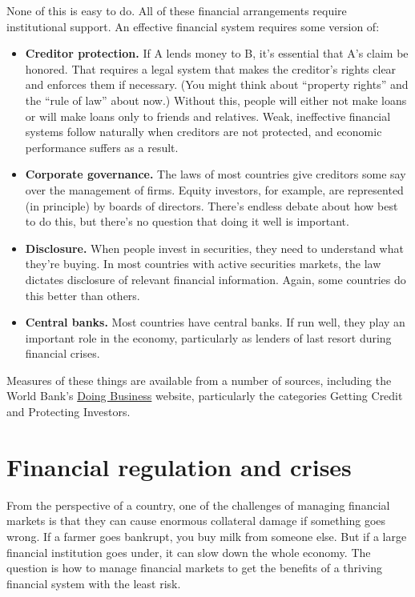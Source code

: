 None of this is easy to do.
All of these financial arrangements
require institutional support.
An effective financial system requires some version of:
%
\begin{itemize}
\item\textbf{Creditor protection. }
If A lends money to B, it's essential that A's claim be honored.
That requires a legal system that makes
the creditor's rights clear and enforces them if necessary.
(You might think about ``property rights'' and the ``rule of law''
about now.)
Without this, people will either not make loans or will make loans only to friends and relatives.
Weak, ineffective financial systems follow naturally
when creditors are not protected,
and economic performance suffers as a result.

\item \textbf{Corporate governance. }
The laws of most countries give creditors some
say over the management of firms.
Equity investors, for example,
are represented (in principle) by boards of directors.
There's endless debate about how best to do this,
but there's no question that doing it well is important.

\item \textbf{Disclosure. }
When people invest in securities, they need to understand what
they're buying.
In most countries with active securities markets,
the law dictates disclosure of relevant financial information.
Again, some countries do this better than others.

\item \textbf{Central banks. }
Most countries have central banks. If run well, they play an important role in the economy,
particularly as lenders of last resort during financial crises.
\end{itemize}

Measures of these things are available from a number
of sources,
including the World Bank's
\href{http://www.doingbusiness.org/}{Doing Business}
website,
particularly the categories Getting Credit and Protecting Investors.


\section{Financial regulation  and crises}

From the perspective of a country, one of
the challenges of managing financial markets is that they
can cause enormous collateral damage if something goes wrong.
If a farmer goes bankrupt, you buy milk from someone else.
But if a large financial institution goes under,
it can slow down the whole economy.
The question is how to manage financial markets to get the benefits
of a thriving financial system with the least risk.

